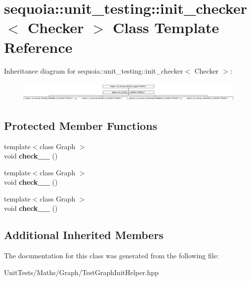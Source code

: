 \hypertarget{classsequoia_1_1unit__testing_1_1init__checker}{}\section{sequoia\+::unit\+\_\+testing\+::init\+\_\+checker$<$ Checker $>$ Class Template Reference}
\label{classsequoia_1_1unit__testing_1_1init__checker}
Inheritance diagram for sequoia\+::unit\+\_\+testing\+::init\+\_\+checker$<$ Checker $>$\+:\begin{figure}[H]
\begin{center}
\leavevmode
\includegraphics[height=1.021898cm]{classsequoia_1_1unit__testing_1_1init__checker}
\end{center}
\end{figure}
\subsection*{Protected Member Functions}
\begin{DoxyCompactItemize}
\item 
\mbox{\label{classsequoia_1_1unit__testing_1_1init__checker_afaabf18de45e93218fd46e7ed7ee2584}} 
{\footnotesize template$<$class Graph $>$ }\\void {\bfseries check\+\_\+\_} ()
\item 
\mbox{\label{classsequoia_1_1unit__testing_1_1init__checker_a6c154048d473ff1b78ba3c25b6dcee23}} 
{\footnotesize template$<$class Graph $>$ }\\void {\bfseries check\+\_\+\_} ()
\item 
\mbox{\label{classsequoia_1_1unit__testing_1_1init__checker_aeba14d665fb959b0d4661a333610cd26}} 
{\footnotesize template$<$class Graph $>$ }\\void {\bfseries check\+\_\+\_} ()
\end{DoxyCompactItemize}
\subsection*{Additional Inherited Members}


The documentation for this class was generated from the following file\+:\begin{DoxyCompactItemize}
\item 
Unit\+Tests/\+Maths/\+Graph/Test\+Graph\+Init\+Helper.\+hpp\end{DoxyCompactItemize}
